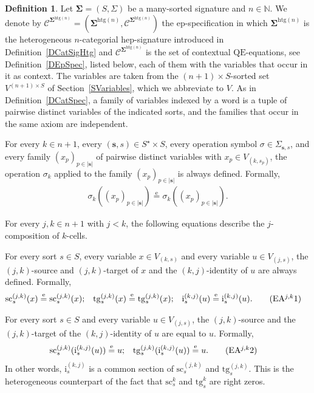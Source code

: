 \documentclass[a4paper, reqno]{amsbook}
\newcommand{\sig}[1]{\mathbf{#1}}             %
\newcommand{\spec}[1]{\boldsymbol{\mathcal{#1}}} %
\newcommand{\eeq}{\overset{\mathrm e}{=}}      %
\newcommand{\QE}{\mathrm{QE}}
\newcommand{\htg}{\mathrm{htg}}                %
\newcommand{\src}{\mathrm{sc}}
\newcommand{\tgt}{\mathrm{tg}}
\theoremstyle{plain}
\theoremstyle{definition}
\newtheorem{definition}[theorem]{Definition}
\begin{document}
\begin{definition}\label{DCatSpecHtg}
Let $\sig{\Sigma}=(S,\Sigma)$ be a many-sorted signature and $n\in\mathbb{N}$.
We denote by $\spec{C}^{\sig{\Sigma}^{\htg(n)}}=(\sig{\Sigma}^{\htg(n)},\mathcal{C}^{\sig{\Sigma}^{\htg(n)}})$ the ep-specification in which $\sig{\Sigma}^{\htg(n)}$ is the heterogeneous $n$-categorial hep-signature introduced in Definition~\ref{DCatSigHtg} and $\mathcal{C}^{\sig{\Sigma}^{\htg(n)}}$ is the set of contextual $\QE$-equations, see Definition~\ref{DEpSpec}, listed below, each of them with the variables that occur in it as context.
The variables are taken from the $(n+1)\times S$-sorted set $V^{(n+1)\times S}$ of Section~\ref{SVariables}, which we abbreviate to $V$.
As in Definition~\ref{DCatSpec}, a family of variables indexed by a word is a tuple of pairwise distinct variables of the indicated sorts, and the families that occur in the same axiom are independent.

For every $k\in n+1$, every $(\mathbf{s},s)\in S^{\star}\times S$, every operation symbol $\sigma\in \Sigma_{\mathbf{s},s}$, and every family $(x_{p})_{p\in \lvert\mathbf{s}\rvert}$ of pairwise distinct variables with $x_{p}\in V_{(k,s_{p})}$, the operation $\sigma_{k}$ applied to the family $(x_{p})_{p\in \lvert\mathbf{s}\rvert}$ is always defined.
Formally,
\begin{align*}
\sigma_{k}((x_{p})_{p\in \lvert\mathbf{s}\rvert})\eeq\sigma_{k}((x_{p})_{p\in \lvert\mathbf{s}\rvert}).\label{ACatHtgEA0}\tag{EA0}
\end{align*}

For every $j,k\in n+1$ with $j<k$, the following equations describe the $j$-composition of $k$-cells.

For every sort $s\in S$, every variable $x\in V_{(k,s)}$ and every variable $u\in V_{(j,s)}$, the $(j,k)$-source and $(j,k)$-target of $x$ and the $(k,j)$-identity of $u$ are always defined.
Formally,
\begin{align*}
\src^{(j,k)}_{s}(x)&\eeq\src^{(j,k)}_{s}(x);
&
\tgt^{(j,k)}_{s}(x)&\eeq\tgt^{(j,k)}_{s}(x);
&
\mathrm{i}^{(k,j)}_{s}(u)&\eeq\mathrm{i}^{(k,j)}_{s}(u).\label{ACatHtgEAjk1}\tag{EA$^{j,k}$1}
\end{align*}

For every sort $s\in S$ and every variable $u\in V_{(j,s)}$, the $(j,k)$-source and the $(j,k)$-target of the $(k,j)$-identity of $u$ are equal to $u$.
Formally,
\begin{align*}
\src^{(j,k)}_{s}(\mathrm{i}^{(k,j)}_{s}(u))&\eeq u;
&
\tgt^{(j,k)}_{s}(\mathrm{i}^{(k,j)}_{s}(u))&\eeq u.\label{ACatHtgEAjk2}\tag{EA$^{j,k}$2}
\end{align*}
In other words, $\mathrm{i}^{(k,j)}_{s}$ is a common section of $\src^{(j,k)}_{s}$ and $\tgt^{(j,k)}_{s}$.
This is the heterogeneous counterpart of the fact that $\src^{k}_{s}$ and $\tgt^{k}_{s}$ are right zeros.


\end{definition}
\end{document}
